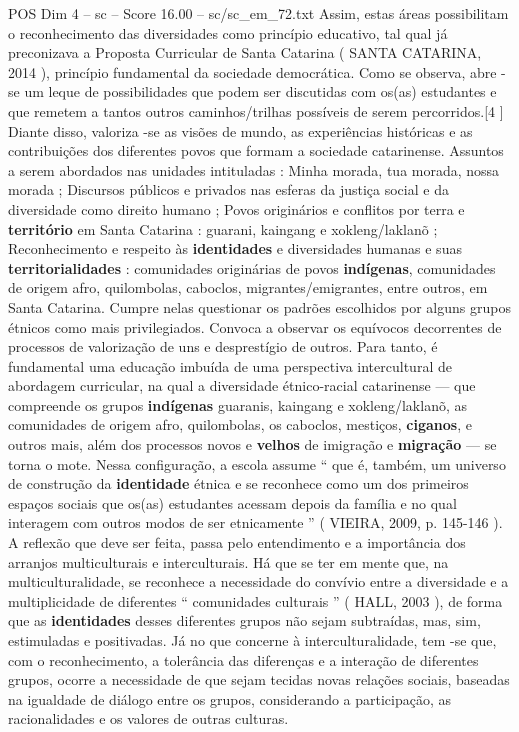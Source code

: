 \begin{textsample}{POS Dim 4 – sc – Score 16.00 – sc/sc\_em\_72.txt}
Assim, estas áreas possibilitam o reconhecimento das diversidades como princípio educativo, tal qual já preconizava a Proposta Curricular de Santa Catarina ( SANTA CATARINA, 2014 ), princípio fundamental da sociedade democrática.
Como se observa, abre -se um leque de possibilidades que podem ser discutidas com os(as) estudantes e que remetem a tantos outros caminhos/trilhas possíveis de serem percorridos.[4 ] Diante disso, valoriza -se as visões de mundo, as experiências históricas e as contribuições dos diferentes povos que formam a sociedade catarinense.
Assuntos a serem abordados nas unidades intituladas : Minha morada, tua morada, nossa morada ; Discursos públicos e privados nas esferas da justiça social e da diversidade como direito humano ; Povos originários e conflitos por terra e \textbf{território} em Santa Catarina : guarani, kaingang e xokleng/laklanõ ; Reconhecimento e respeito às \textbf{identidades} e diversidades humanas e suas \textbf{territorialidades} : comunidades originárias de povos \textbf{indígenas}, comunidades de origem afro, quilombolas, caboclos, migrantes/emigrantes, entre outros, em Santa Catarina.
Cumpre nelas questionar os padrões escolhidos por alguns grupos étnicos como mais privilegiados.
Convoca a observar os equívocos decorrentes de processos de valorização de uns e desprestígio de outros.
Para tanto, é fundamental uma educação imbuída de uma perspectiva intercultural de abordagem curricular, na qual a diversidade étnico-racial catarinense — que compreende os grupos \textbf{indígenas} guaranis, kaingang e xokleng/laklanõ, as comunidades de origem afro, quilombolas, os caboclos, mestiços, \textbf{ciganos}, e outros mais, além dos processos novos e \textbf{velhos} de imigração e \textbf{migração} — se torna o mote.
Nessa configuração, a escola assume “ que é, também, um universo de construção da \textbf{identidade} étnica e se reconhece como um dos primeiros espaços sociais que os(as) estudantes acessam depois da família e no qual interagem com outros modos de ser etnicamente ” ( VIEIRA, 2009, p. 145-146 ).
A reflexão que deve ser feita, passa pelo entendimento e a importância dos arranjos multiculturais e interculturais.
Há que se ter em mente que, na multiculturalidade, se reconhece a necessidade do convívio entre a diversidade e a multiplicidade de diferentes “ comunidades culturais ” ( HALL, 2003 ), de forma que as \textbf{identidades} desses diferentes grupos não sejam subtraídas, mas, sim, estimuladas e positivadas.
Já no que concerne à interculturalidade, tem -se que, com o reconhecimento, a tolerância das diferenças e a interação de diferentes grupos, ocorre a necessidade de que sejam tecidas novas relações sociais, baseadas na igualdade de diálogo entre os grupos, considerando a participação, as racionalidades e os valores de outras culturas.

\end{textsample}
